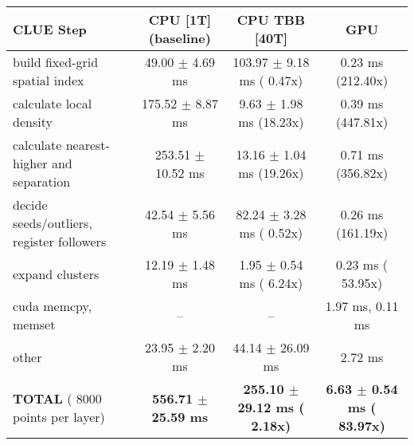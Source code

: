     \begin{tabular}{l|c|c|c}
    \hline
    CLUE Step                                 & CPU [1T] (baseline)         & CPU TBB [40T]                         & GPU                       \\ \hline
    build fixed-grid spatial index            &  49.00 $\pm$  4.69 ms       & 103.97 $\pm$  9.18 ms ( 0.47x)        &   0.23 ms (212.40x)       \\
    calculate local density                   & 175.52 $\pm$  8.87 ms       &   9.63 $\pm$  1.98 ms (18.23x)        &   0.39 ms (447.81x)       \\
    calculate nearest-higher and separation   & 253.51 $\pm$ 10.52 ms       &  13.16 $\pm$  1.04 ms (19.26x)        &   0.71 ms (356.82x)       \\
    decide seeds/outliers, register followers &  42.54 $\pm$  5.56 ms       &  82.24 $\pm$  3.28 ms ( 0.52x)        &   0.26 ms (161.19x)       \\
    expand clusters                           &  12.19 $\pm$  1.48 ms       &   1.95 $\pm$  0.54 ms ( 6.24x)        &   0.23 ms ( 53.95x)       \\ \hline
    cuda memcpy, memset                       & --                          & --                                    &   1.97 ms,   0.11 ms      \\ 
    other                                     &  23.95 $\pm$  2.20 ms       &  44.14 $\pm$ 26.09 ms                 &   2.72 ms                 \\ \hline
    \textbf{TOTAL} ( 8000 points per layer)   & \textbf{556.71 $\pm$ 25.59 ms} & \textbf{255.10 $\pm$ 29.12 ms ( 2.18x)} & \textbf{  6.63 $\pm$  0.54 ms ( 83.97x)}  \\
    \hline 
    \end{tabular}
    \linebreak


